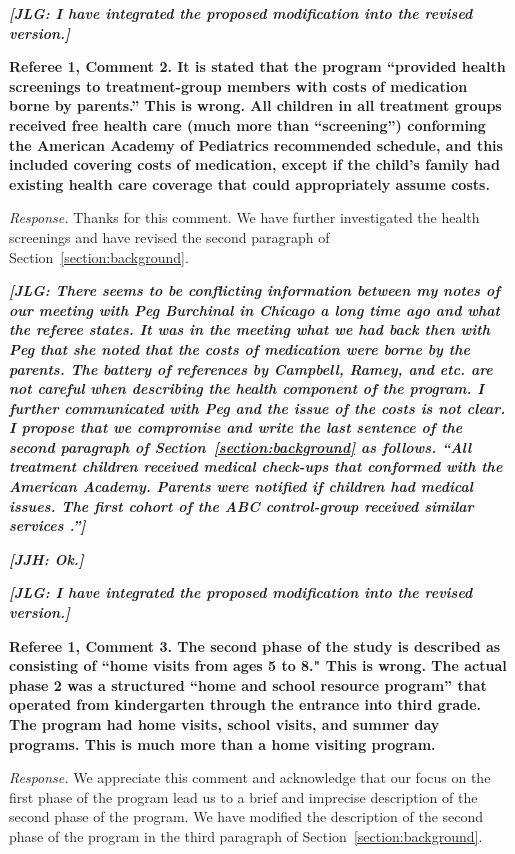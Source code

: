 \textit{\textbf{[JLG: I have integrated the proposed modification into the revised version.]}}

\noindent \textbf{Referee 1, Comment 2. It is stated that the program ``provided health screenings to treatment-group members with costs of medication borne by parents.'' This is wrong. All children in all treatment groups received free health care (much more than ``screening'') conforming the American Academy of Pediatrics recommended schedule, and this included covering costs of medication, except if the child's family had existing health care coverage that could appropriately assume costs.}

\noindent \textit{Response.} Thanks for this comment. We have further investigated the health screenings and have revised the second paragraph of Section~\ref{section:background}.

\textit{\textbf{[JLG: There seems to be conflicting information between my notes of our meeting with Peg Burchinal in Chicago a long time ago and what the referee states. It was in the meeting what we had back then with Peg that she noted that the costs of medication were borne by the parents. The battery of references by Campbell, Ramey, and etc. are not careful when describing the health component of the program. I further communicated with Peg and the issue of the costs is not clear. I propose that we compromise and write the last sentence of the second paragraph of Section~\ref{section:background} as follows. ``All treatment children received medical check-ups that conformed with the American Academy. Parents were notified if children had medical issues. The first cohort of the ABC control-group received similar services \citep{Campbell_Conti_etal_2014_EarlyChildhoodInvestments,Henderson-et-al_1982_NEJoM}.'']}}

\textit{\textbf{[JJH: Ok.]}}

\textit{\textbf{[JLG: I have integrated the proposed modification into the revised version.]}}

\noindent \textbf{Referee 1, Comment 3. The second phase of the study is described as consisting of ``home visits from ages 5 to 8." This is wrong. The actual phase 2 was a structured ``home and school resource program'' that operated from kindergarten through the entrance into third grade. The program had home visits, school visits, and summer day programs. This is much more than a home visiting program.}

\noindent \textit{Response.} We appreciate this comment and acknowledge that our focus on the first phase of the program lead us to a brief and imprecise description of the second phase of the program. We have modified the description of the second phase of the program in the third paragraph of Section~\ref{section:background}.

